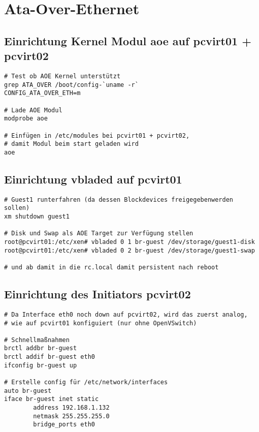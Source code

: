 \chapter{Ata-Over-Ethernet}
\label{chap:aoe}
\section{Einrichtung Kernel Modul aoe auf pcvirt01 + pcvirt02}
\setupVerbatimOut

\begin{verbatim}
# Test ob AOE Kernel unterstützt
grep ATA_OVER /boot/config-`uname -r`
CONFIG_ATA_OVER_ETH=m

# Lade AOE Modul
modprobe aoe

# Einfügen in /etc/modules bei pcvirt01 + pcvirt02,
# damit Modul beim start geladen wird
aoe
\end{verbatim}

\section{Einrichtung vbladed auf pcvirt01}

\setupVerbatimOut
\begin{verbatim}
# Guest1 runterfahren (da dessen Blockdevices freigegebenwerden sollen)
xm shutdown guest1

# Disk und Swap als AOE Target zur Verfügung stellen
root@pcvirt01:/etc/xen# vbladed 0 1 br-guest /dev/storage/guest1-disk  
root@pcvirt01:/etc/xen# vbladed 0 2 br-guest /dev/storage/guest1-swap

# und ab damit in die rc.local damit persistent nach reboot
\end{verbatim}

\section{Einrichtung des Initiators pcvirt02}

\setupVerbatimOut
\begin{verbatim}
# Da Interface eth0 noch down auf pcvirt02, wird das zuerst analog,
# wie auf pcvirt01 konfiguiert (nur ohne OpenVSwitch)

# Schnellmaßnahmen
brctl addbr br-guest
brctl addif br-guest eth0
ifconfig br-guest up

# Erstelle config für /etc/network/interfaces 
auto br-guest
iface br-guest inet static
        address 192.168.1.132
        netmask 255.255.255.0
        bridge_ports eth0
\end{verbatim}


